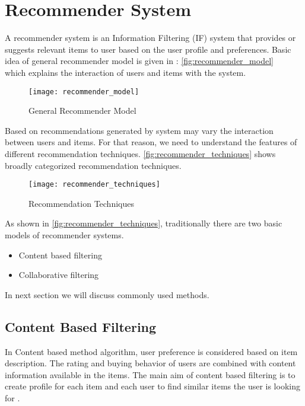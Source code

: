 \section{Recommender System}
A recommender system is an Information Filtering (IF) system that provides or suggests relevant items to user based on the user profile and preferences. Basic idea of general recommender model is given in : \autoref{fig:recommender_model} \\ which explains the interaction of users and items with the system.

\begin{figure}[H]
	\centering
	\texttt{[image: recommender\_model]}
	\caption{General Recommender Model \cite{3}}
	\label{fig:recommender_model}
\end{figure}

\noindent Based on recommendations generated by system may vary the interaction between users and items. For that reason, we need to understand the features of different recommendation techniques. \autoref{fig:recommender_techniques} shows broadly categorized recommendation techniques.

\begin{figure}[H]
	\centering
	\texttt{[image: recommender\_techniques]}
	\caption{Recommendation Techniques \cite{33}}
	\label{fig:recommender_techniques}
\end{figure}


As shown in \autoref{fig:recommender_techniques}, traditionally there are two basic models of recommender systems. \begin{itemize} \item Content based filtering \item Collaborative filtering \end{itemize}
In next section we will discuss commonly used methods.
\pagebreak

\subsection{Content Based Filtering}
In Content based method algorithm, user preference is considered based on item description. The rating and buying behavior of users are combined with content information available in the items. The main aim of content based filtering is to create profile for each item and each user to find similar items the user is looking for \cite{6}.
\\

